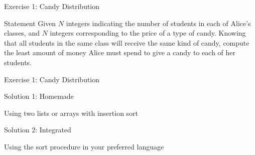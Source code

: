 \documentclass{beamer}
\begin{document}
\begin{frame}{Exercise 1: Candy Distribution}
  
  \begin{overlayarea}{\textwidth}{\textheight}
  \begin{block}{Statement}
    Given $N$ integers indicating the number of students in each of Alice’s classes, and $N$ integers corresponding to the price of a type of candy. 
    Knowing that all students in the same class will receive the same kind of candy, compute the least amount of money Alice must spend to give a candy to each of her students.
  \end{block}
  
  
  
  \end{overlayarea}
\end{frame}

\begin{frame}[fragile]{Exercise 1: Candy Distribution}
  
  \begin{code}{Solution 1: Homemade}
    \begin{PseudoCode}
Using two lists or arrays with insertion sort
    \end{PseudoCode}
  \end{code}
  
  \begin{code}{Solution 2: Integrated}
    \begin{PseudoCode}
Using the sort procedure in your preferred language
    \end{PseudoCode}
  \end{code}
  
\end{frame}
\end{document}
